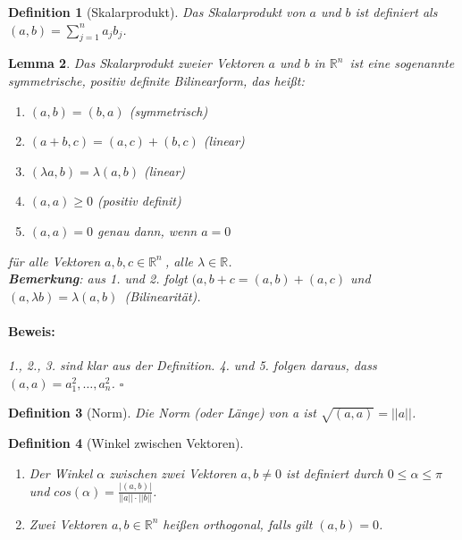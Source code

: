 \documentclass{report}
\newcommand{\IN}[1]{\index{#1|BH}}
\newcommand{\lb}{\lambda}
\newcommand{\R}{\mathbb{R}}
\newcommand{\Rn}{\mathbb{R}^n\ }
\newcommand{\mRn}{$\mathbb{R}^n$\ }
\newcommand{\al}{\alpha}
\theoremstyle{customrem}
\theoremstyle{customdef}
\newtheorem{definition}{Definition}[chapter]
\newtheorem{lem}[definition]{Lemma}
\renewenvironment{proof}{\vspace{-.75cm}\paragraph{Beweis: }}{\vspace{-.5cm}\hfill$\square$}
\begin{document}
	\begin{definition}[Skalarprodukt]
		\IN{Skalar!-produkt}
		Das Skalarprodukt von $a$ und $b$ ist definiert als $(a, b) = \sum_{j=1}^n a_j b_j$.
	\end{definition}
	
	\begin{lem}
		Das Skalarprodukt zweier Vektoren $a$ und $b$ in \mRn ist eine sogenannte symmetrische, positiv definite Bilinearform, das heißt:
		\begin{enumerate}
			\item $(a, b) = (b, a)$ (symmetrisch) 
			\item $(a + b, c) = (a, c) + (b, c)$ (linear) 
			\item $(\lb a, b) = \lb(a, b)$ (linear) 
			\item $(a, a) \ge 0$ (positiv definit) 
			\item $(a, a) = 0$ genau dann, wenn $a=0$ 
		\end{enumerate}
		für alle Vektoren $a, b, c \in \Rn$, alle $\lb \in \R$.\\
		\textbf{Bemerkung}: aus 1. und 2. folgt $(a, b+c = (a,b) + (a,c)$ und $(a, \lb b) = \lb (a, b)$\ (Bilinearität).\\
		\begin{proof}
			1., 2., 3. sind klar aus der Definition. 4. und 5. folgen daraus, dass $(a, a) = a_1^2, \ldots, a_n^2$.
		\end{proof}
	\end{lem}

	\begin{definition}[Norm]
		Die Norm (oder Länge) von a ist $\sqrt{(a, a)} = ||a||$.
	\end{definition}

	\begin{definition}[Winkel zwischen Vektoren]$ $\vspace{-.5cm}
		\begin{enumerate}
			\item Der Winkel $\al$ zwischen zwei Vektoren $a, b \neq 0$ ist definiert durch $0 \le \al \le \pi$ und $cos(\al) = \frac{|(a,b)|}{||a||\cdot ||b||}$.
			\item Zwei Vektoren $a, b \in \R^n$ heißen orthogonal, falls gilt $(a, b) = 0$.
		\end{enumerate}
	\end{definition}
	
\end{document}
